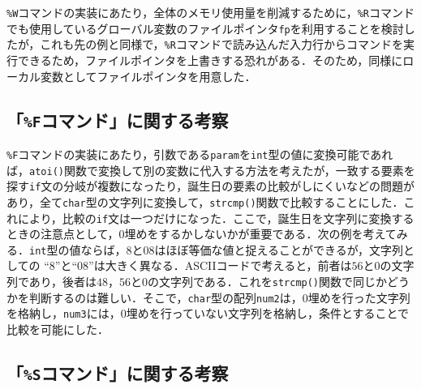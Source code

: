 \verb|%W|コマンドの実装にあたり，全体のメモリ使用量を削減するために，\verb|%R|コマンドでも使用しているグローバル変数のファイルポインタ\verb|fp|を利用することを検討したが，これも先の例と同様で，\verb|%R|コマンドで読み込んだ入力行からコマンドを実行できるため，ファイルポインタを上書きする恐れがある．そのため，同様にローカル変数としてファイルポインタを用意した．

\subsection{「\texttt{\%F}コマンド」に関する考察}

\verb|%F|コマンドの実装にあたり，引数である\verb|param|を\verb|int|型の値に変換可能であれば，\verb|atoi()|関数で変換して別の変数に代入する方法を考えたが，一致する要素を探す\verb|if|文の分岐が複数になったり，誕生日の要素の比較がしにくいなどの問題があり，全て\verb|char|型の文字列に変換して，\verb|strcmp()|関数で比較することにした．これにより，比較の\verb|if|文は一つだけになった．ここで，誕生日を文字列に変換するときの注意点として，$0$埋めをするかしないかが重要である．次の例を考えてみる．\verb|int|型の値ならば，$8$と$08$はほぼ等価な値と捉えることができるが，文字列としての “$8$”と“$08$”は大きく異なる．ASCIIコードで考えると，前者は$56$と$0$の文字列であり，後者は$48$，$56$と$0$の文字列である．これを\verb|strcmp()|関数で同じかどうかを判断するのは難しい\cite{www:label11}．そこで，\verb|char|型の配列\verb|num2|は，$0$埋めを行った文字列を格納し，\verb|num3|には，$0$埋めを行っていない文字列を格納し，条件とすることで比較を可能にした．

\subsection{「\texttt{\%S}コマンド」に関する考察}

